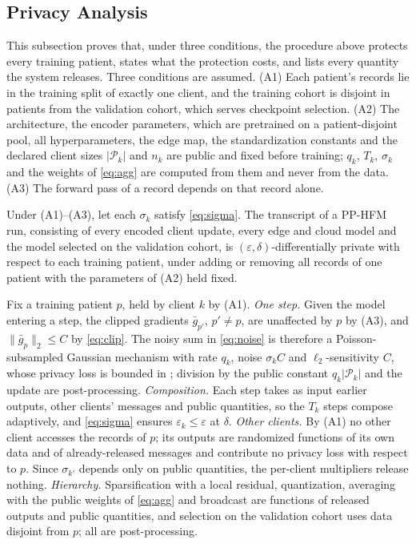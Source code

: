 \subsection{Privacy Analysis}
\label{sec:method:analysis}
This subsection proves that, under three conditions, the procedure above
protects every training patient, states what the protection costs, and lists every quantity the
system releases. Three conditions are assumed. (A1) Each patient's records lie in the training
split of exactly one client, and the training cohort is disjoint in patients
from the validation cohort, which serves checkpoint selection. (A2) The architecture, the encoder
parameters, which are pretrained on a patient-disjoint pool, all
hyperparameters, the edge map, the standardization constants and the
declared client sizes $|\mathcal{P}_k|$ and $n_k$ are public and fixed before
training; $q_k$, $T_k$, $\sigma_k$ and the weights of \eqref{eq:agg} are
computed from them and never from the data. (A3) The forward pass of a record depends on that record
alone.

\begin{theorem}
\label{thm:guarantee}
Under (A1)--(A3), let each $\sigma_k$ satisfy \eqref{eq:sigma}. The transcript
of a PP-HFM run, consisting of every encoded client update, every edge and
cloud model and the model selected on the validation cohort, is
$(\varepsilon,\delta)$-differentially private with respect to each
training patient, under adding or removing all records of one patient with
the parameters of (A2) held fixed.
\end{theorem}

\begin{IEEEproof}
Fix a training patient $p$, held by client $k$ by (A1). \emph{One step.} Given
the model entering a step, the clipped gradients $\bar g_{p'}$, $p' \neq p$,
are unaffected by $p$ by (A3), and $\lVert \bar g_p\rVert_2 \le C$ by
\eqref{eq:clip}. The noisy sum in \eqref{eq:noise} is therefore a
Poisson-subsampled Gaussian mechanism with rate $q_k$, noise $\sigma_k C$ and
$\ell_2$-sensitivity $C$, whose privacy loss is bounded in
\cite{ref29, ref33}; division by the public constant $q_k|\mathcal{P}_k|$ and
the update are post-processing. \emph{Composition.} Each step takes as input
earlier outputs, other clients' messages and public quantities, so the $T_k$
steps compose adaptively, and \eqref{eq:sigma} ensures $\varepsilon_k \le \varepsilon$ at $\delta$. \emph{Other clients.} By (A1) no
other client accesses the records of $p$; its outputs are randomized
functions of its own data and of already-released messages and contribute no
privacy loss with respect to $p$. Since $\sigma_{k'}$ depends only on public
quantities, the per-client multipliers release nothing. \emph{Hierarchy.}
Sparsification with a local residual, quantization, averaging with the public
weights of \eqref{eq:agg} and broadcast are functions of released outputs and
public quantities, and selection on the validation cohort uses data disjoint
from $p$; all are post-processing.
\end{IEEEproof}

